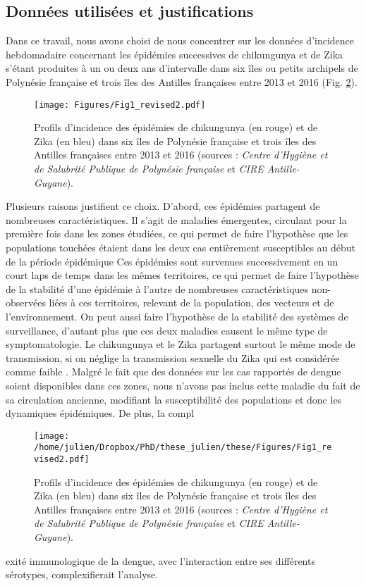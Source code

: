 \subsection{Données utilisées et justifications}

Dans ce travail, nous avons choisi de nous concentrer sur les données d'incidence hebdomadaire concernant les épidémies successives de chikungunya et de Zika s'étant produites à un ou deux ans d'intervalle dans six îles ou petits archipels de Polynésie française et trois îles des Antilles françaises entre 2013 et 2016 (Fig. \ref{fig:profiles}).
\begin{figure}[t]
	\centering
	\texttt{[image: Figures/Fig1\_revised2.pdf]}
	\caption{Profils d'incidence des épidémies de chikungunya (en rouge) et de Zika (en bleu) dans six îles de Polynésie française et trois îles des Antilles françaises entre 2013 et 2016 (sources : {\em Centre d'Hygiène et de Salubrité Publique de Polynésie française} et {\em CIRE Antille-Guyane}).}
	\label{fig:profiles}
\end{figure}
Plusieurs raisons justifient ce choix.
D'abord, ces épidémies partagent de nombreuses caractéristiques.
Il s'agit de maladies émergentes, circulant pour la première fois dans les zones étudiées, ce qui permet de faire l'hypothèse que les populations touchées étaient dans les deux cas entièrement susceptibles au début de la période épidémique
Ces épidémies sont survenues successivement en un court laps de temps dans les mêmes territoires, ce qui permet de faire l'hypothèse de la stabilité d'une épidémie à l'autre de nombreuses caractéristiques non-observées liées à ces territoires, relevant de la population, des vecteurs et de l'environnement.
On peut aussi faire l'hypothèse de la stabilité des systèmes de surveillance, d'autant plus que ces deux maladies causent le même type de symptomatologie.
Le chikungunya et le Zika partagent surtout le même mode de transmission, si on néglige la transmission sexuelle du Zika qui est considérée comme faible \cite{althaus_how_2016}.
Malgré le fait que des données sur les cas rapportés de dengue soient disponibles dans ces zones, nous n'avons pas inclus cette maladie du fait de sa circulation ancienne, modifiant la susceptibilité des populations et donc les dynamiques épidémiques.
De plus, la compl
\begin{figure}[h]
	\centering
	\texttt{[image: /home/julien/Dropbox/PhD/these\_julien/these/Figures/Fig1\_revised2.pdf]}
	\caption{Profils d'incidence des épidémies de chikungunya (en rouge) et de Zika (en bleu) dans six îles de Polynésie française et trois îles des Antilles françaises entre 2013 et 2016 (sources : {\em Centre d'Hygiène et de Salubrité Publique de Polynésie française} et {\em CIRE Antille-Guyane}).}
	\label{fig:profiles}
\end{figure}exité immunologique de la dengue, avec l'interaction entre ses différents sérotypes, complexifierait l'analyse.
